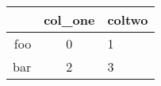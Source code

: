 \begin{tabular}{rc|l}
\toprule
 & col\_one & coltwo \\
\midrule
foo & 0 & 1 \\
bar & 2 & 3 \\
\bottomrule
\end{tabular}
